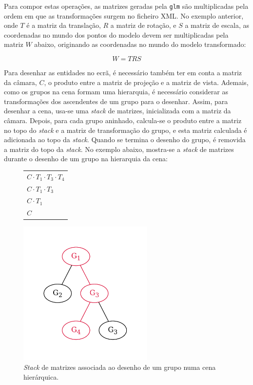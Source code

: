 \documentclass[12pt, a4paper]{article}
\begin{document}
Para compor estas operações, as matrizes geradas pela \texttt{glm} são multiplicadas pela ordem em
que as transformações surgem no ficheiro XML. No exemplo anterior, onde $T$ é a matriz da
translação, $R$ a matriz de rotação, e $S$ a matriz de escala, as coordenadas no mundo dos pontos do
modelo devem ser multiplicadas pela matriz $W$ abaixo, originando as coordenadas no mundo do modelo
transformado:

$$
W = T R S
$$

Para desenhar as entidades no ecrã, é necessário também ter em conta a matriz da câmara, $C$, o
produto entre a matriz de projeção e a matriz de vista. Ademais, como os grupos na cena formam uma
hierarquia, é necessário considerar as transformações dos ascendentes de um grupo para o desenhar.
Assim, para desenhar a cena, usa-se uma \emph{stack} de matrizes, inicializada com a matriz da
câmara. Depois, para cada grupo aninhado, calcula-se o produto entre a matriz no topo do
\emph{stack} e a matriz de transformação do grupo, e esta matriz calculada é adicionada ao topo da
\emph{stack}. Quando se termina o desenho do grupo, é removida a matriz do topo da \emph{stack}. No
exemplo abaixo, mostra-se a \emph{stack} de matrizes durante o desenho de um grupo na hierarquia da
cena:

\begin{figure}[h]
    \begin{minipage}{0.5\textwidth}
        \centering
        \begin{tabular}{|>{\centering\arraybackslash}m{3cm}|}
            \hline \\
            \hline $C \cdot T_1 \cdot T_3 \cdot T_4$ \\
            \hline $C \cdot T_1 \cdot T_3$ \\
            \hline $C \cdot T_1$ \\
            \hline $C$ \\
            \hline
        \end{tabular}
    \end{minipage}
    \begin{minipage}{0.5\textwidth}
        \centering
        \includegraphics[width=0.6\textwidth]{res/phase2/SceneGraph.pdf}
    \end{minipage}
    \caption{\emph{Stack} de matrizes associada ao desenho de um grupo numa cena hierárquica.}
\end{figure}
\end{document}
